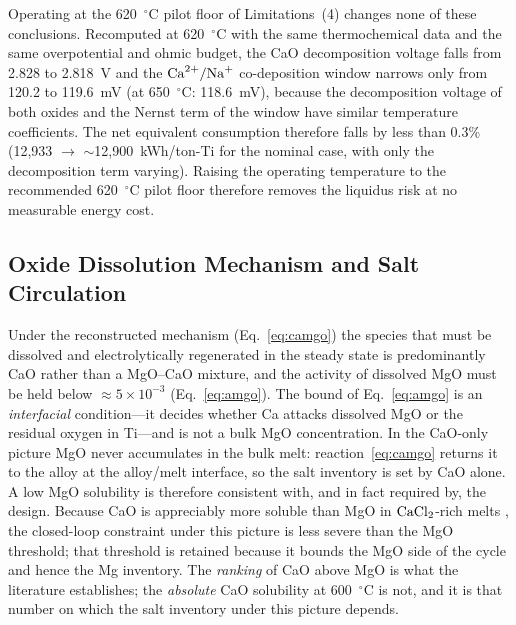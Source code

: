 \documentclass[pdflatex,sn-basic,Numbered]{sn-jnl}
\begin{document}
Operating at the 620~$^{\circ}$C pilot floor of Limitations~(4) changes none of these conclusions. Recomputed at 620~$^{\circ}$C with the same thermochemical data and the same overpotential and ohmic budget, the CaO decomposition voltage falls from 2.828 to 2.818~V and the $\ce{Ca^{2+}/Na+}$ co-deposition window narrows only from 120.2 to 119.6~mV (at 650~$^{\circ}$C: 118.6~mV), because the decomposition voltage of both oxides and the Nernst term of the window have similar temperature coefficients. The net equivalent consumption therefore falls by less than 0.3\% (12{,}933 $\to$ $\sim$12{,}900~kWh/ton-Ti for the nominal case, with only the decomposition term varying). Raising the operating temperature to the recommended 620~$^{\circ}$C pilot floor therefore removes the liquidus risk at no measurable energy cost.

\subsection{Oxide Dissolution Mechanism and Salt Circulation}
\label{subsec:dissolution}

Under the reconstructed mechanism (Eq.~\ref{eq:camgo}) the species that must be dissolved and electrolytically regenerated in the steady state is predominantly CaO rather than a MgO--CaO mixture, and the activity of dissolved MgO must be held below $\approx 5\times10^{-3}$ (Eq.~\ref{eq:amgo}). The bound of Eq.~\ref{eq:amgo} is an \emph{interfacial} condition---it decides whether Ca attacks dissolved MgO or the residual oxygen in Ti---and is not a bulk MgO concentration. In the CaO-only picture MgO never accumulates in the bulk melt: reaction~\ref{eq:camgo} returns it to the alloy at the alloy/melt interface, so the salt inventory is set by CaO alone. A low MgO solubility is therefore consistent with, and in fact required by, the design. Because CaO is appreciably more soluble than MgO in $\ce{CaCl2}$-rich melts \cite{wang2008cao}, the closed-loop constraint under this picture is less severe than the MgO threshold; that threshold is retained because it bounds the MgO side of the cycle and hence the Mg inventory. The \emph{ranking} of CaO above MgO is what the literature establishes; the \emph{absolute} CaO solubility at 600~$^{\circ}$C is not, and it is that number on which the salt inventory under this picture depends.
\end{document}
